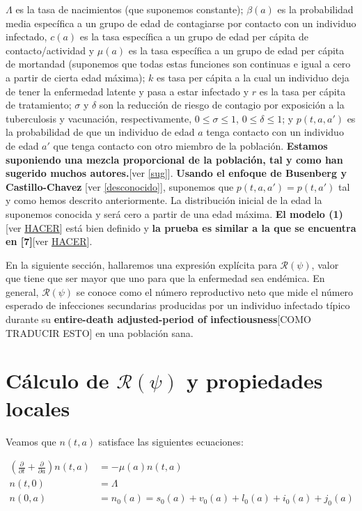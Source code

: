 \documentclass[
]{book}
\begin{document}
\(\Lambda\) es la tasa de nacimientos (que suponemos constante); \(\beta(a)\) es la probabilidad media específica a un grupo de edad de contagiarse por contacto con un individuo infectado, \(c(a)\) es la tasa específica a un grupo de edad per cápita de contacto/actividad y \(\mu(a)\) es la tasa específica a un grupo de edad per cápita de mortandad (suponemos que todas estas funciones son continuas e igual a cero a partir de cierta edad máxima); \(k\) es tasa per cápita a la cual un individuo deja de tener la enfermedad latente y pasa a estar infectado y \(r\) es la tasa per cápita de tratamiento; \(\sigma\) y \(\delta\) son la reducción de riesgo de contagio por exposición a la tuberculosis y vacunación, respectivamente, \(0 \leq \sigma \leq 1\), \(0 \leq \delta \leq 1\); y \(p(t,a,a')\) es la probabilidad de que un individuo de edad \(a\) tenga contacto con un individuo de edad \(a'\) que tenga contacto con otro miembro de la población. \textbf{Estamos suponiendo una mezcla proporcional de la población, tal y como han sugerido muchos autores.}{[}ver \ref{sug}{]}. \textbf{Usando el enfoque de Busenberg y Castillo-Chavez} {[}ver \ref{desconocido}{]}, suponemos que \(p(t,a,a')=p(t,a')\) tal y como hemos descrito anteriormente. La distribución inicial de la edad la suponemos conocida y será cero a partir de una edad máxima. \textbf{El modelo (1)}{[}ver \href{eq1}{HACER}{]} está bien definido y \textbf{la prueba es similar a la que se encuentra en {[}7{]}}{[}ver \protect\hyperlink{hacer}{HACER}{]}.

En la siguiente sección, hallaremos una expresión explícita para \(\mathscr{R(\psi)}\), valor que tiene que ser mayor que uno para que la enfermedad sea endémica. En general, \(\mathscr{R(\psi)}\) se conoce como el número reproductivo neto que mide el número esperado de infecciones secundarias producidas por un individuo infectado típico durante su \textbf{entire-death adjusted-period of infectiousness}{[}COMO TRADUCIR ESTO{]} en una población sana.

\hypertarget{sec3}{%
\section{\texorpdfstring{Cálculo de \(\mathscr{R}(\psi)\) y propiedades locales}{Cálculo de \textbackslash mathscr\{R\}(\textbackslash psi) y propiedades locales}}\label{sec3}}

Veamos que \(n(t,a)\) satisface las siguientes ecuaciones:

\begin{align*}
\left( \frac{\partial}{\partial t}+\frac{\partial}{\partial a} \right) n(t,a) &= -\mu(a)n(t,a) \\
n(t,0) &= \Lambda  \\
n(0,a) &= n_0(a) = s_0(a) +v_0(a)+l_0(a)+i_0(a)+j_0(a)
\end{align*}
\end{document}

